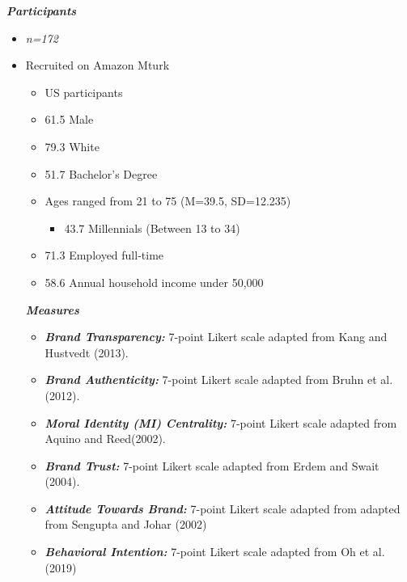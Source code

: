 \documentclass[a0,portrait]{a0poster}
\begin{document}
\begin{minipage}[c]{\linewidth}
\begin{framed}
\begin{multicols}{2}
\color{Maroon}
\textbf{\emph{Participants}}
\color{Black}
\begin{itemize}
\item \textit{n=172}
\item Recruited on Amazon Mturk
\begin{itemize}
    \item US participants 
    \item 61.5\text{\%} Male
    \item 79.3\text{\%} White
    \item 51.7\text{\%} Bachelor's Degree
    \item Ages ranged from 21 to 75 (M=39.5, SD=12.235)
    \begin{itemize}
        \item 43.7\text{\%} Millennials (Between 13 to 34)
    \end{itemize}
    \item 71.3\text{\%} Employed full-time
    \item 58.6\text{\%} Annual household income under \text{\$}50,000
\end{itemize}
\color{Maroon}
\textbf{\emph{Measures}}
\color{Black}


\begin{itemize} \item 
\textbf{\emph{Brand Transparency:}} 7-point Likert scale adapted from Kang and Hustvedt (2013).
\end{itemize}
\begin{itemize}
    \item \textbf{\emph{Brand Authenticity:}} 7-point Likert scale adapted from Bruhn et al.(2012).
\end{itemize}
\begin{itemize} \item
\textbf{\emph{Moral Identity (MI) Centrality:}} 7-point Likert scale adapted from Aquino and Reed(2002).
\end{itemize}
\begin{itemize} \item
\textbf{\emph{Brand Trust:}} 7-point Likert scale adapted from
Erdem and Swait (2004).
\end{itemize}
\begin{itemize} \item
\textbf{\emph{Attitude Towards Brand:}} 7-point Likert scale adapted from adapted from Sengupta and Johar (2002)
\end{itemize}
\begin{itemize} \item
\textbf{\emph{Behavioral Intention:}} 7-point Likert scale adapted from Oh et al. (2019)
\end{itemize}
\end{itemize}


\end{multicols}
\end{framed}
\end{minipage}
\end{document}
